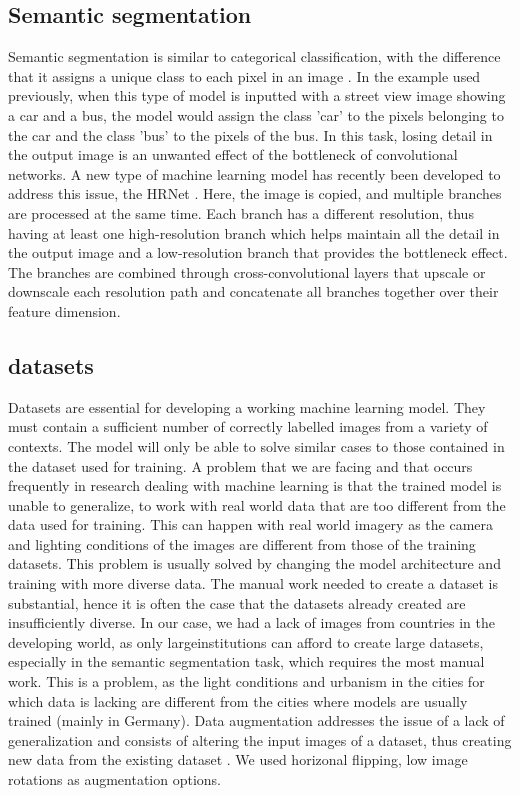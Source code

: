 \documentclass[journal,article,submit,pdftex,moreauthors]{Definitions/mdpi}
\begin{document}
\subsection{Semantic segmentation}
Semantic segmentation is similar to categorical classification, with the difference that it assigns a unique class to each pixel in an image \cite{Liu2019RecentSegmentation}. In the example used previously, when this type of model is inputted with a street view image showing a car and a bus, the model would assign the class 'car' to the pixels belonging to the car and the class 'bus' to the pixels of the bus. In this task, losing detail in the output image is an unwanted effect of the bottleneck of convolutional networks. A new type of machine learning model has recently been developed to address this issue, the HRNet \cite{Wang2019DeepRecognition}. Here, the image is copied, and multiple branches are processed at the same time. Each branch has a different resolution, thus having at least one high-resolution branch which helps maintain all the detail in the output image and a low-resolution branch that provides the bottleneck effect. The branches are combined through cross-convolutional layers  that upscale or downscale each resolution path and concatenate all branches together over their feature dimension. 

\subsection{datasets}
Datasets are essential for developing a working machine learning model. They must contain a sufficient number of correctly labelled images from a variety of contexts. The model will only be able to solve similar cases to those contained in the dataset used for training. A problem that we are facing and that occurs frequently in research dealing with machine learning is that the trained model is unable to generalize, to work with real world data that are too different from the data used for training. This can happen with real world imagery as the camera and lighting conditions of the images are different from those of the training datasets. This problem is usually solved by changing the model architecture and training with more diverse data. The manual work needed to create a dataset is substantial, hence it is often the case that the datasets already created are insufficiently diverse. In our case, we had a lack of images from countries in the developing world, as only largeinstitutions can afford to create large datasets, especially in the semantic segmentation task, which requires the most manual work. This is a problem, as the light conditions and urbanism in the cities for which data is lacking are different from  the cities where models are usually trained (mainly in Germany).
Data augmentation addresses the issue of a lack of generalization  and consists of altering the input images of a dataset, thus creating new data from the existing dataset \cite{Buslaev2020Albumentations:Augmentations}. We used horizonal flipping, low image rotations as augmentation options.
\end{document}
